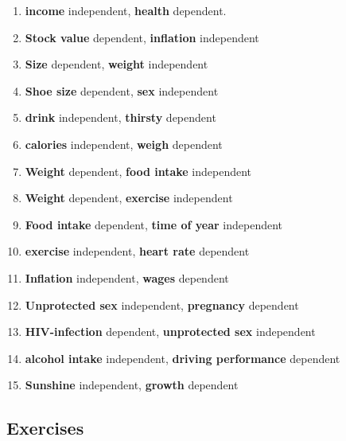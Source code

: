 \documentclass{article}\usepackage[]{graphicx}\usepackage[]{color}
\begin{document}
\begin{enumerate}

\item \textbf{income} independent, \textbf{health} dependent.
\item \textbf{Stock value} dependent, \textbf{inflation} independent
\item \textbf{Size} dependent, \textbf{weight} independent
\item \textbf{Shoe size} dependent, \textbf{sex} independent
\item \textbf{drink} independent, \textbf{thirsty} dependent
\item \textbf{calories} independent, \textbf{weigh} dependent
\item \textbf{Weight} dependent, \textbf{food intake} independent
\item \textbf{Weight} dependent, \textbf{exercise} independent
\item \textbf{Food intake} dependent, \textbf{time of year} independent
\item \textbf{exercise} independent, \textbf{heart rate} dependent
\item \textbf{Inflation} independent, \textbf{wages} dependent
\item \textbf{Unprotected sex} independent, \textbf{pregnancy} dependent
\item \textbf{HIV-infection} dependent, \textbf{unprotected sex} independent
\item \textbf{alcohol intake} independent, \textbf{driving performance} dependent
\item \textbf{Sunshine} independent, \textbf{growth} dependent


\end{enumerate}




\subsection{Exercises}
\end{document}
